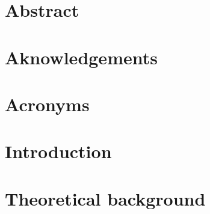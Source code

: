 \documentclass[a4paper, 11pt]{report}
\begin{document}



\clearpage

\chapter*{\centering Abstract}
\blindtext


\clearpage


\chapter*{\centering Aknowledgements}
\blindtext


\clearpage

\chapter*{\centering Acronyms}

\clearpage

\clearpage

\tableofcontents
\clearpage
\listoffigures
\clearpage
\listoftables
\clearpage















\chapter{Introduction}


\chapter{Theoretical background}

\end{document}
